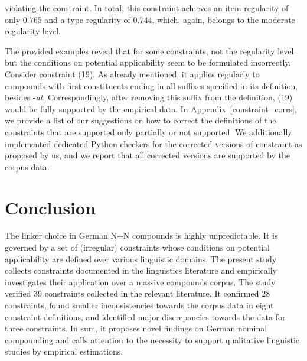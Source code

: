 \documentclass[10pt, a4paper]{article}
\begin{document}
violating the constraint. In total, this constraint achieves an item regularity of only $0.765$ and a type regularity of $0.744$, which, again, belongs to the moderate regularity level.

The provided examples reveal that for some constraints, not the regularity level but the conditions on potential applicability seem to be formulated incorrectly. Consider constraint (19). As already mentioned, it applies regularly to compounds with first constituents ending in all suffixes specified in its definition, besides -\textit{at}. Correspondingly, after removing this suffix from the definition, (19) would be fully supported by the empirical data. In Appendix~\ref{constraint_corrs}, we provide a list of our suggestions on how to correct the definitions of the constraints that are supported only partially or not supported. We additionally implemented dedicated Python checkers for the corrected versions of constraint as proposed by us, and we report that all corrected versions are supported by the corpus data.



\section{Conclusion}
\label{sec:outro}

The linker choice in German N+N compounds is highly unpredictable. It is governed by a set of (irregular) constraints whose conditions on potential applicability are defined over various linguistic domains. The present study collects constraints documented in the linguistics literature and empirically investigates their application over a massive compounds corpus. The study verified 39 constraints collected in the relevant literature. It confirmed 28 constraints, found smaller inconsistencies towards the corpus data in eight constraint definitions, and identified major discrepancies towards the data for three constraints. In sum, it proposes novel findings on German nominal compounding and calls attention to the necessity to support qualitative linguistic studies by empirical estimations.

\end{document}

